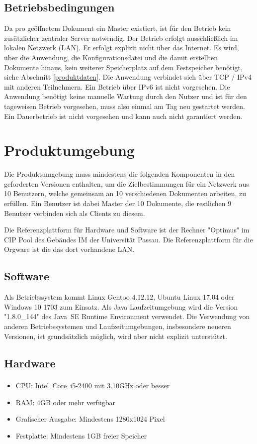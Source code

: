 \documentclass{scrartcl}
\begin{document}
\subsection{Betriebsbedingungen}
Da pro geöffnetem Dokument ein Master existiert, ist für den Betrieb kein zusätzlicher zentraler Server notwendig. Der Betrieb erfolgt ausschließlich im lokalen Netzwerk (LAN). Er erfolgt explizit nicht über das Internet. Es wird, über die Anwendung, die Konfigurationsdatei und die damit erstellten Dokumente hinaus, kein weiterer Speicherplatz auf dem Festspeicher benötigt, siehe Abschnitt \ref{produktdaten}. Die Anwendung verbindet sich über TCP / IPv4 mit anderen Teilnehmern. Ein Betrieb über IPv6 ist nicht vorgesehen. Die Anwendung benötigt keine manuelle Wartung durch den Nutzer und ist für den tageweisen Betrieb vorgesehen, muss also einmal am Tag neu gestartet werden. Ein Dauerbetrieb ist nicht vorgesehen und kann auch nicht garantiert werden.

\section{Produktumgebung}
Die Produktumgebung muss mindestens die folgenden Komponenten in den geforderten Versionen enthalten, um die Zielbestimmungen für ein Netzwerk aus 10 Benutzern, welche gemeinsam an 10 verschiedenen Dokumenten arbeiten, zu erfüllen. Ein Benutzer ist dabei Master der 10 Dokumente, die restlichen 9 Benutzer verbinden sich als Clients zu diesem. 

Die Referenzplattform für Hardware und Software ist der Rechner "Optimus" im CIP Pool des Gebäudes IM der Universität Passau. Die Referenzplattform für die Orgware ist die das dort vorhandene LAN.
\subsection{Software}
Als Betriebssystem kommt Linux Gentoo 4.12.12, Ubuntu Linux 17.04 oder Windows 10 1703 zum Einsatz. Als Java Laufzeitumgebung wird die Version "1.8.0\_144" des Java\texttrademark\ SE Runtime Environment verwendet. Die Verwendung von anderen Betriebssystemen und Laufzeitumgebungen, insbesondere neueren Versionen, ist grundsätzlich möglich, wird aber nicht explizit unterstützt.

\subsection{Hardware}
\begin{itemize}
\item CPU: Intel\textsuperscript{\textregistered}\ Core\texttrademark\ i5-2400 mit 3.10GHz oder besser
\item RAM: 4GB oder mehr verfügbar
\item Grafischer Ausgabe: Mindestens 1280x1024 Pixel
\item Festplatte: Mindestens 1GB freier Speicher
\end{itemize}
\end{document}
